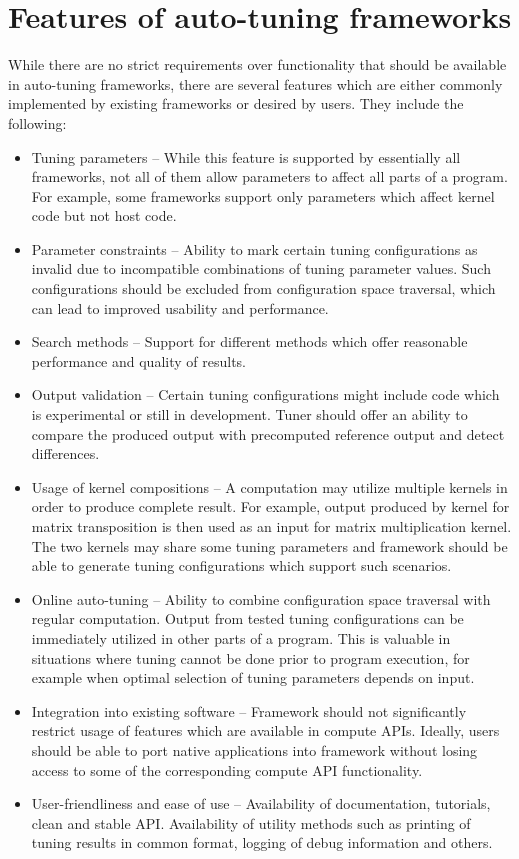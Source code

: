 \documentclass
[
    digital, %
    oneside, %
    table, %
    nolof, %
    nolot, %
    nocover %
]{fithesis3}
\begin{document}
\section{Features of auto-tuning frameworks}
While there are no strict requirements over functionality that should be available in auto-tuning frameworks, there are several features which are either
commonly implemented by existing frameworks or desired by users. They include the following: 
\begin{itemize}
    \item Tuning parameters -- While this feature is supported by essentially all frameworks, not all of them allow parameters to affect
    all parts of a program. For example, some frameworks support only parameters which affect kernel code but not host code.
    \item Parameter constraints -- Ability to mark certain tuning configurations as invalid due to incompatible combinations of tuning parameter values.
    Such configurations should be excluded from configuration space traversal, which can lead to improved usability and performance.
    \item Search methods -- Support for different methods which offer reasonable performance and quality of results.
    \item Output validation -- Certain tuning configurations might include code which is experimental or still in development. Tuner should offer
    an ability to compare the produced output with precomputed reference output and detect differences.
    \item Usage of kernel compositions -- A computation may utilize multiple kernels in order to produce complete result. For example, output produced
    by kernel for matrix transposition is then used as an input for matrix multiplication kernel. The two kernels may share some tuning parameters and
    framework should be able to generate tuning configurations which support such scenarios.
    \item Online auto-tuning -- Ability to combine configuration space traversal with regular computation. Output from tested tuning configurations can
    be immediately utilized in other parts of a program. This is valuable in situations where tuning cannot be done prior to program execution, for
    example when optimal selection of tuning parameters depends on input.
    \item Integration into existing software -- Framework should not significantly restrict usage of features which are available in compute APIs.
    Ideally, users should be able to port native applications into framework without losing access to some of the corresponding compute API functionality.
    \item User-friendliness and ease of use -- Availability of documentation, tutorials, clean and stable API. Availability of utility methods such
    as printing of tuning results in common format, logging of debug information and others.
\end{itemize}
\end{document}
